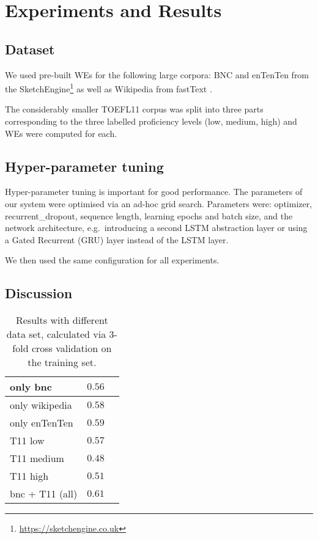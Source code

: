 \documentclass[11pt,a4paper]{article}
\begin{document}

\section{Experiments and Results} %
\label{sec:results}

\subsection{Dataset} %
We used pre-built WEs for the following large corpora: BNC and enTenTen \cite{1120431}
from the SketchEngine\footnote{\url{https://sketchengine.co.uk}}
\cite{DBLP:journals/corr/BojanowskiGJM16} as well as Wikipedia from fastText
\cite{mikolov2018advances}. 

The considerably smaller TOEFL11 corpus was split into three parts corresponding to the three labelled proficiency levels (low, medium, high) and WEs were computed for each.

\subsection{Hyper-parameter tuning} %
Hyper-parameter tuning is important for good performance. The parameters of our system were optimised via an ad-hoc grid search. Parameters were:
optimizer, recurrent\_dropout, sequence length, learning epochs and batch size, and the network architecture, e.g.~introducing a second LSTM abstraction layer or using a Gated Recurrent (GRU) layer instead of the LSTM layer.

We then used the same configuration for all experiments.

\subsection{Discussion} %
\begin{table}[h]
\begin{center}
\begin{tabular}{l|r|r}
\hline
only bnc   		& $0.56$ \\ \hline
only wikipedia 	& $0.58$ \\ \hline
only enTenTen	& $0.59$ \\ \hline
\hline
T11 low 		& $0.57$ \\ \hline
T11 medium		& $0.48$ \\ \hline
T11 high		& $0.51$ \\ \hline
\hline
bnc + T11 (all) & $0.61$ \\ \hline
\end{tabular}
\end{center}
\caption{\label{tab:results}Results with different data set, calculated via 3-fold cross validation on the training set.} 
\end{table}
\end{document}
